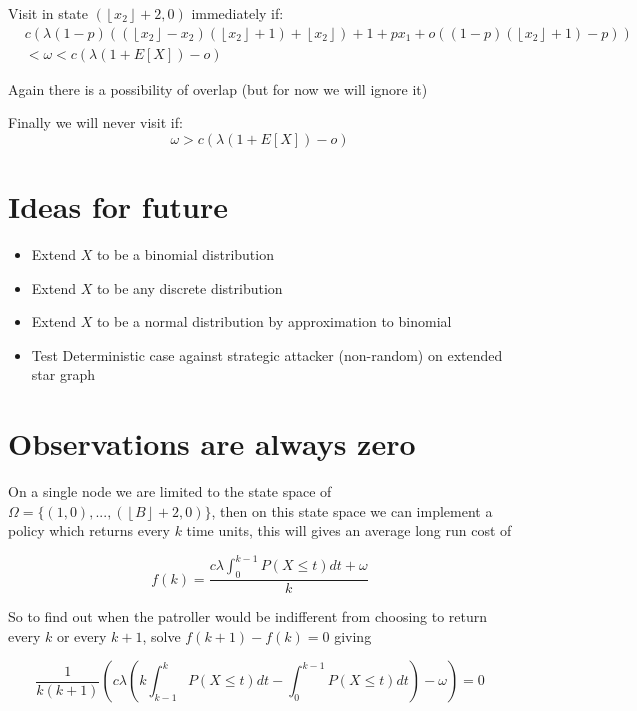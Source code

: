 \documentclass[a4paper,10pt]{article}
\newcommand{\floor}[1]{\left \lfloor #1 \right \rfloor}
\theoremstyle{definition}
\theoremstyle{definition}
\theoremstyle{remark}
\theoremstyle{definition}
\begin{document}
Visit in state $(\floor{x_{2}}+2,0)$ immediately if:
\begin{align}
&c (\lambda (1-p)((\floor{x_{2}}-x_{2})(\floor{x_{2}}+1) + \floor{x_{2}}) + 1 +px_{1} +o((1-p)(\floor{x_{2}}+1)-p)) \nonumber \\
&< \omega < c(\lambda (1+E[X])-o)
\end{align}

Again there is a possibility of overlap (but for now we will ignore it)

Finally we will never visit if:
\begin{equation}
\omega > c(\lambda (1+E[X])-o)
\end{equation}


\section{Ideas for future}
\begin{itemize}
\item Extend $X$ to be a binomial distribution
\item Extend $X$ to be any discrete distribution
\item Extend $X$ to be a normal distribution by approximation to binomial
\item Test Deterministic case against strategic attacker (non-random) on extended star graph
\end{itemize}


\appendix
{}
\appendixpage
\addappheadtotoc
\section{Observations are always zero}
\label{Observations are always zero}

On a single node we are limited to the state space of $\Omega=\{ (1,0),...,(\floor{B}+2,0) \}$, then on this state space we can implement a policy which returns every $k$ time units, this will gives an average long run cost of

\begin{equation}
f(k)=\frac{c \lambda \int_{0}^{k-1} P(X \leq t) dt +\omega}{k}
\end{equation}

So to find out when the patroller would be indifferent from choosing to return every $k$ or every $k+1$, solve $f(k+1)-f(k)=0$ giving

$$\frac{1}{k(k+1)}(c \lambda (k \int_{k-1}^{k} P(X \leq t) dt - \int_{0}^{k-1} P(X \leq t) dt ) -\omega)=0 $$
\end{document}
